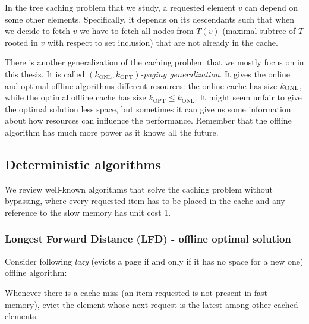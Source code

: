 In the tree caching problem that we study, a requested element $v$ can depend 
on some other elements. Specifically, it depends on its descendants such that 
when we decide to fetch $v$ we have to fetch all nodes from $T(v)$ (maximal subtree of $T$ rooted in $v$ with respect to set inclusion)
that are not already in the cache.

There is another generalization of the caching problem that we mostly focus on in 
this thesis. It is called 
$(k_{\mathrm{ONL}}, k_{\mathrm{OPT}})$\textit{-paging generalization}. It gives 
the online and optimal offline algorithms different resources: the online cache has
size $k_{\mathrm{ONL}}$, while the optimal offline cache has size 
$k_{\mathrm{OPT}} \leq k_{\mathrm{ONL}}$. It might seem 
unfair to give the optimal solution less space, but sometimes it can give us 
some information about how resources can influence the performance. Remember 
that the offline algorithm has much more power as it knows all the future.

\subsection{Deterministic algorithms}
We review well-known algorithms that solve the caching problem without bypassing, 
where every requested item has to be placed in the cache and any reference to 
the slow memory has unit cost 1.
\subsubsection{Longest Forward Distance (LFD) - offline optimal solution}
Consider following \textit{lazy} (evicts a page if and only if it has no space for a new one) 
offline algorithm: 
\begin{myalgo}
Whenever there is a cache miss (an item requested is not 
present in fast memory), evict the element whose next request is the latest among other 
cached elements.
\end{myalgo}

